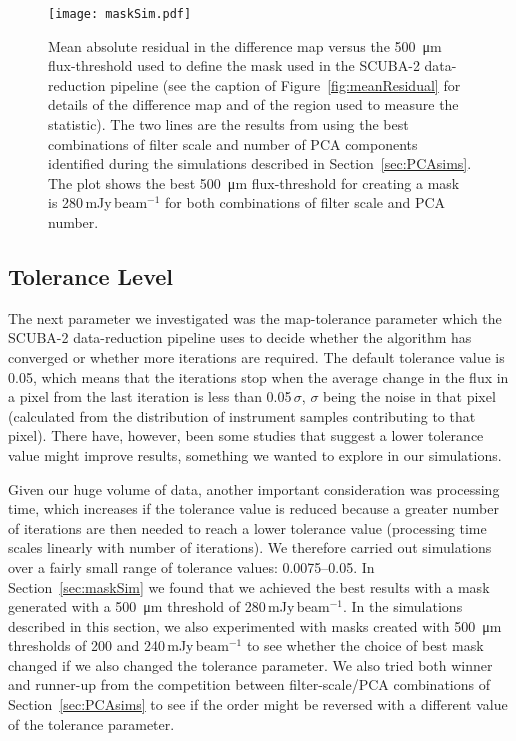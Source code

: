 \documentclass[a4paper,fleqn,usenatbib, twocolumn]{aastex63}
\begin{document}
\begin{figure}
  \centering
  \texttt{[image: maskSim.pdf]}
  \caption{Mean absolute residual in the difference map versus
  the \SI{500}{\micro\meter} flux-threshold used to define the mask used in the
  SCUBA-2 data-reduction pipeline (see the caption of Figure~\ref{fig:meanResidual}
  for details of the difference map and of the region used to measure
  the statistic). The two lines are the results from using the best
  combinations of filter scale and number of PCA components identified during
  the simulations described in
   Section~\ref{sec:PCAsims}.
           The plot shows the best \SI{500}{\micro\meter} flux-threshold for creating
           a mask is 280\,mJy\,beam$^{-1}$ for both combinations of filter
           scale and PCA number.}
  \label{fig:maskResidual}
\end{figure}


\subsection{Tolerance Level}

The next parameter we investigated was the map-tolerance parameter which 
the SCUBA-2 data-reduction pipeline uses to decide whether the algorithm has
converged or whether more iterations are required. 
The default tolerance value is 0.05, which means that the iterations stop
when the average change in the flux in a pixel from the last iteration is less than 0.05\,$\sigma$, 
$\sigma$ being the noise in that pixel (calculated from the distribution of instrument samples contributing to that pixel). There have, however, been
some studies  \citep{Mairs2015,Smith2019}
that suggest a lower tolerance value might improve results, something we wanted to
explore in our simulations.
 
Given our huge volume of data, another important consideration was processing
time, which increases if the tolerance value is reduced because a greater number
of iterations are then needed to reach a lower tolerance value (processing
time scales linearly with number of iterations). We therefore 
carried out simulations over a fairly small range of tolerance values: 0.0075--0.05.
In Section~\ref{sec:maskSim} we found 
that we achieved the best results with a mask generated with a \SI{500}{\micro\meter} threshold of
280\,mJy\,beam$^{-1}$. In the simulations described in this section, we also
experimented with masks created with  \SI{500}{\micro\meter} thresholds
of 200 and 240\,mJy\,beam$^{-1}$ to see whether the choice of best mask changed
if we also changed the tolerance parameter. We also tried both winner
and runner-up from the competition between filter-scale/PCA combinations of
Section~\ref{sec:PCAsims} to see if the order might be reversed with a different value
of the tolerance parameter.
 
\end{document}
